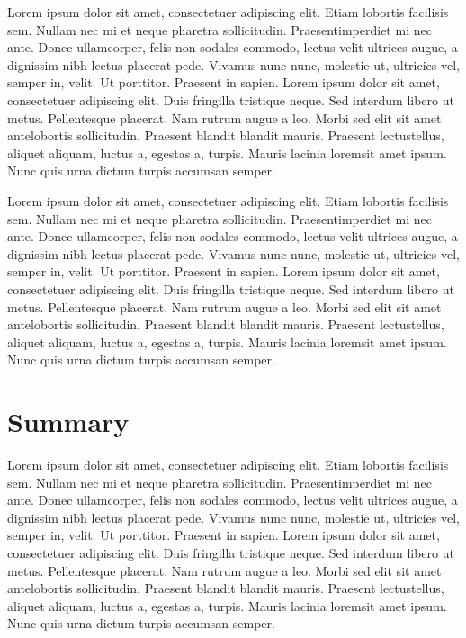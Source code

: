 Lorem ipsum dolor sit amet, consectetuer adipiscing elit. Etiam lobortis facilisis sem. Nullam nec mi et neque pharetra sollicitudin. Praesentimperdiet mi nec ante. Donec ullamcorper, felis non sodales commodo, lectus velit ultrices augue, a dignissim nibh lectus placerat pede. Vivamus nunc nunc, molestie ut, ultricies vel, semper in, velit. Ut porttitor. Praesent in sapien. Lorem ipsum dolor sit amet, consectetuer adipiscing elit. Duis fringilla tristique neque. Sed interdum libero ut metus. Pellentesque placerat. Nam rutrum augue a leo. Morbi sed elit sit amet antelobortis sollicitudin. Praesent blandit blandit mauris. Praesent lectustellus, aliquet aliquam, luctus a, egestas a, turpis. Mauris lacinia loremsit amet ipsum. Nunc quis urna dictum turpis accumsan semper.

Lorem ipsum dolor sit amet, consectetuer adipiscing elit. Etiam lobortis facilisis sem. Nullam nec mi et neque pharetra sollicitudin. Praesentimperdiet mi nec ante. Donec ullamcorper, felis non sodales commodo, lectus velit ultrices augue, a dignissim nibh lectus placerat pede. Vivamus nunc nunc, molestie ut, ultricies vel, semper in, velit. Ut porttitor. Praesent in sapien. Lorem ipsum dolor sit amet, consectetuer adipiscing elit. Duis fringilla tristique neque. Sed interdum libero ut metus. Pellentesque placerat. Nam rutrum augue a leo. Morbi sed elit sit amet antelobortis sollicitudin. Praesent blandit blandit mauris. Praesent lectustellus, aliquet aliquam, luctus a, egestas a, turpis. Mauris lacinia loremsit amet ipsum. Nunc quis urna dictum turpis accumsan semper.


\section{Summary}

Lorem ipsum dolor sit amet, consectetuer adipiscing elit. Etiam lobortis facilisis sem. Nullam nec mi et neque pharetra sollicitudin. Praesentimperdiet mi nec ante. Donec ullamcorper, felis non sodales commodo, lectus velit ultrices augue, a dignissim nibh lectus placerat pede. Vivamus nunc nunc, molestie ut, ultricies vel, semper in, velit. Ut porttitor. Praesent in sapien. Lorem ipsum dolor sit amet, consectetuer adipiscing elit. Duis fringilla tristique neque. Sed interdum libero ut metus. Pellentesque placerat. Nam rutrum augue a leo. Morbi sed elit sit amet antelobortis sollicitudin. Praesent blandit blandit mauris. Praesent lectustellus, aliquet aliquam, luctus a, egestas a, turpis. Mauris lacinia loremsit amet ipsum. Nunc quis urna dictum turpis accumsan semper.


